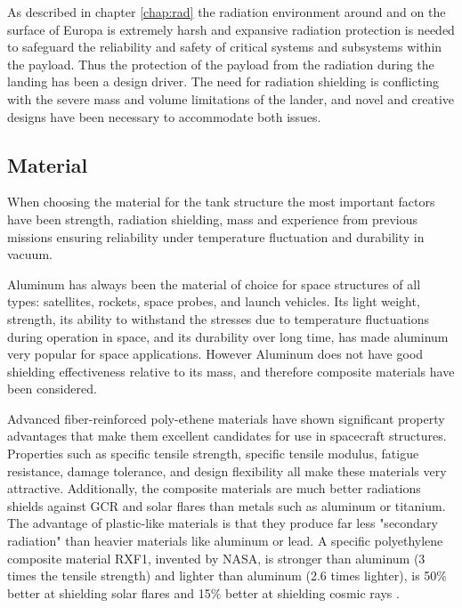 
As described in chapter \ref{chap:rad} the radiation environment around and on the surface of Europa is extremely harsh and expansive radiation protection is needed to safeguard the reliability
and safety of critical systems and subsystems within the payload. Thus the protection of the payload from the radiation during the landing has been a design driver. The need for radiation shielding is conflicting with the severe mass and volume limitations of the lander, and novel and creative designs have been necessary to accommodate both issues.


\subsection{Material}

When choosing the material for the tank structure the most important factors have been strength, radiation shielding, mass and experience from previous missions ensuring reliability under temperature fluctuation and durability in vacuum. 

Aluminum has always been the material of choice for space structures of all types: satellites, rockets, space probes, and launch vehicles. Its light weight, strength, its ability to withstand the stresses due to temperature fluctuations during operation in space, and its durability over long time, has made aluminum very popular for space applications. However Aluminum does not have good shielding effectiveness relative to its mass, and therefore composite materials have been considered.

Advanced fiber-reinforced poly-ethene materials have shown significant property advantages that make
them excellent candidates for use in spacecraft structures. Properties such as
specific tensile strength, specific tensile modulus, fatigue resistance, damage tolerance, and design flexibility all make these materials very attractive. Additionally, the composite materials are much better radiations shields against GCR and solar flares than metals such as aluminum or titanium. The advantage of plastic-like materials is that they produce far less "secondary radiation" than heavier materials like aluminum or lead. A specific polyethylene composite material RXF1, invented by NASA, is stronger than aluminum (3 times the tensile strength) and lighter than aluminum (2.6 times lighter), is 50$\%$ better at shielding solar flares and 15$\%$ better at shielding cosmic rays \cite{RXF1}.

